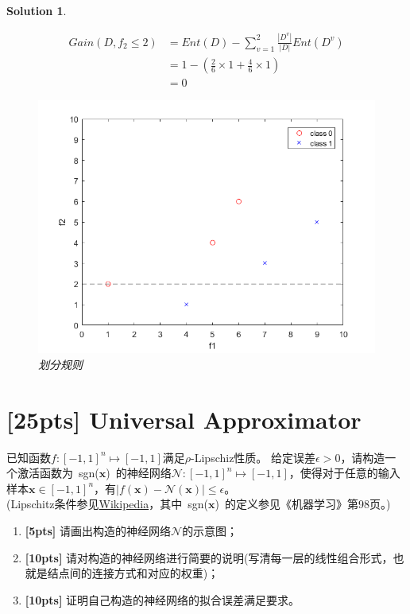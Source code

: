 \documentclass[a4paper,UTF8]{article}
\numberwithin{equation}{section}
\newtheorem*{solution}{Solution}
\begin{document}
\begin{solution}
\begin{enumerate}
\begin{equation}
\begin{aligned}
 Gain(D, f_2\leq 2) &= Ent(D) - \sum_{v=1}^{2}\frac{|D^v|}{|D|}Ent(D^v)\\
 &= 1 - (\frac{2}{6}\times 1 + \frac{4}{6}\times 1)\\
 &= 0
 \end{aligned}
 \end{equation}
 \begin{figure}[!h]
 	\centering   
 	\includegraphics[scale=0.5]{coordinate2.png}  
 	\caption{划分规则} 
 	\label{coordinate2}
 \end{figure}
 \end{enumerate}
 \end{solution}
\newpage

\section{[25pts] Universal Approximator}
已知函数$f:[-1, 1]^n \mapsto [-1, 1]$满足$\rho$-Lipschiz性质。 给定误差$\epsilon > 0$，请构造一个激活函数为\mbox{ sgn($\mathbf{x}$) }的神经网络$ \mathcal{N}:[-1,1]^n \mapsto [-1,1] $，使得对于任意的输入样本$ \mathbf{x} \in [-1,1]^n $，有$|f(\mathbf{x}) - \mathcal{N}(\mathbf{x})| \leq \epsilon$。\\
(Lipschitz条件参见\href{https://en.wikipedia.org/wiki/Lipschitz_continuity}{Wikipedia}，其中\mbox{ sgn($\mathbf{x}$) }的定义参见《机器学习》第98页。)

\begin{enumerate}[ {(}1{)}]
	\item \textbf{[5pts]} 请画出构造的神经网络$\mathcal{N}$的示意图；
	
	\item \textbf{[10pts]} 请对构造的神经网络进行简要的说明(写清每一层的线性组合形式，也就是结点间的连接方式和对应的权重)；
	
	\item \textbf{[10pts]} 证明自己构造的神经网络的拟合误差满足要求。
\end{enumerate}
\end{document}
